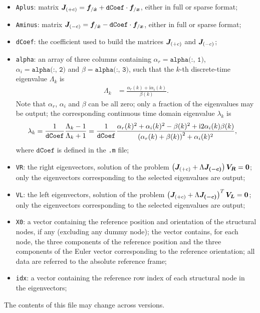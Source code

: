 \begin{itemize}
\item \texttt{Aplus}: 
matrix
$\boldsymbol{J}_{(+c)} = \boldsymbol{f}_{/\dot{\boldsymbol{x}}} + \texttt{dCoef} \cdot \boldsymbol{f}_{/\boldsymbol{x}}$,
either in full or sparse format;

\item \texttt{Aminus}: 
matrix
$\boldsymbol{J}_{(-c)} = \boldsymbol{f}_{/\dot{\boldsymbol{x}}} - \texttt{dCoef} \cdot \boldsymbol{f}_{/\boldsymbol{x}}$,
either in full or sparse format;

\item \texttt{dCoef}: the coefficient used to build the matrices
$\boldsymbol{J}_{(+c)}$ and $\boldsymbol{J}_{(-c)}$;

\item \texttt{alpha}:
an array of three columns containing
$\alpha_r = \texttt{alpha(:, 1)}$,
$\alpha_i = \texttt{alpha(:, 2)}$
and $\beta = \texttt{alpha(:, 3)}$,
such that the $k$-th discrete-time eigenvalue $\Lambda_k$ is
\begin{align}
	\Lambda_k
	&=
	\frac{\alpha_r(k) + \text{i} \alpha_i(k)}{\beta(k)}
	.
\end{align}
Note that $\alpha_r$, $\alpha_i$ and $\beta$ can be all zero;
only a fraction of the eigenvalues may be output;
the corresponding continuous time domain eigenvalue $\lambda_k$ is
\begin{align}
	\lambda_k
	&=
	\frac{1}{\texttt{dCoef}}
	\frac{\Lambda_k - 1}{\Lambda_k + 1}
	=
	\frac{1}{\texttt{dCoef}}
	\frac{
		\alpha_r(k)^2
		+
		\alpha_i(k)^2
		-
		\beta(k)^2
		+
		\text{i} 2 \alpha_i(k) \beta(k)
	}{
		\left( \alpha_r(k) + \beta(k) \right)^2 + \alpha_i(k)^2
	}
	,
\end{align}
where $\texttt{dCoef}$ is defined in the \texttt{.m} file;

\item \texttt{VR}: the right eigenvectors, solution of the problem
$\left( \boldsymbol{J}_{(+c)} + \Lambda \boldsymbol{J_{(-c)}} \right)\boldsymbol{V_R}=\boldsymbol{0}$;
only the eigenvectors corresponding to the selected eigenvalues are output;

\item \texttt{VL}: the left eigenvectors, solution of the problem
$\left( \boldsymbol{J}_{(+c)} + \Lambda \boldsymbol{J_{(-c)}} \right)^T\boldsymbol{V_L}=\boldsymbol{0}$;
only the eigenvectors corresponding to the selected eigenvalues are output;

\item \texttt{X0}: a vector containing the reference position
and orientation of the structural nodes, if any (excluding any dummy node);
the vector contains, for each node, the three components
of the reference position and the three components of the Euler vector
corresponding to the reference orientation; all data are referred
to the absolute reference frame;

\item \texttt{idx}: a vector containing the reference row index
of each structural node in the eigenvectors;
\end{itemize}
The contents of this file may change across versions.

